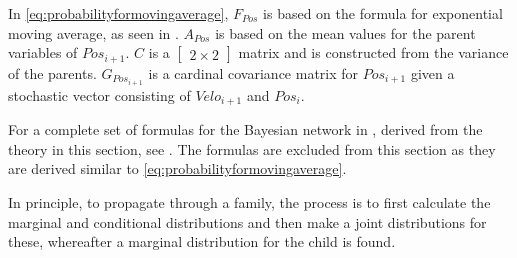 In \eqref{eq:probabilityformovingaverage}, $F_{Pos}$ is based on the formula for exponential moving average, as seen in .
$A_{Pos}$ is based on the mean values for the parent variables of $Pos_{i+1}$.
$C$ is a $\begin{bmatrix}2 \times 2\end{bmatrix}$ matrix and is constructed from the variance of the parents.
$G_{Pos_{i+1}}$ is a cardinal covariance matrix for $Pos_{i+1}$ given a stochastic vector consisting of $Velo_{i+1}$ and $Pos_i$.


For a complete set of formulas for the Bayesian network in , derived from the theory in this section, see .
The formulas are excluded from this section as they are derived similar to \eqref{eq:probabilityformovingaverage}.

In principle, to propagate through a family, the process is to first calculate the marginal and conditional distributions and then make a joint distributions for these, whereafter a marginal distribution for the child is found.